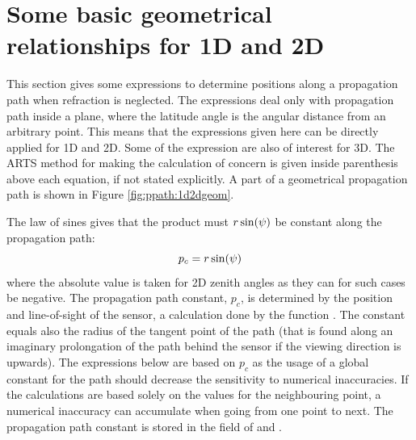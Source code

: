 





\section{Some basic geometrical relationships for 1D and 2D}
\label{sec:ppath:basicgeom}

This section gives some expressions to determine positions along a
propagation path when refraction is neglected. The expressions deal
only with propagation path inside a plane, where the latitude angle is
the angular distance from an arbitrary point. This means that the
expressions given here can be directly applied for 1D and 2D. Some of
the expression are also of interest for 3D. The ARTS method for making
the calculation of concern is given inside parenthesis above each
equation, if not stated explicitly. A part of a geometrical
propagation path is shown in Figure \ref{fig:ppath:1d2dgeom}.

The law of sines gives that the product must $r\sin(\psi)$ be
constant along the propagation path:
\begin{equation}
  p_c = r\sin(\psi)
  \label{eq:ppath:geomconst}
\end{equation}
where the absolute value is taken for 2D zenith angles as they can for
such cases be negative. The propagation path constant, $p_c$, is
determined by the position and line-of-sight of the sensor, a
calculation done by the function . The
constant equals also the radius of the tangent point of the path (that
is found along an imaginary prolongation of the path behind the sensor
if the viewing direction is upwards). The expressions below are based
on $p_c$ as the usage of a global constant for the path should
decrease the sensitivity to numerical inaccuracies. If the
calculations are based solely on the values for the neighbouring
point, a numerical inaccuracy can accumulate when going from one point
to next. The propagation path constant is stored in the field
 of  and .

